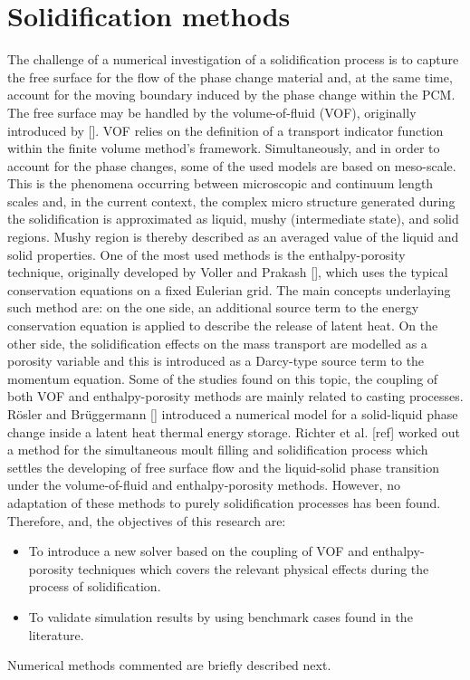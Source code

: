 \section{Solidification methods}
The challenge of a numerical investigation of a solidification process is to capture the free surface for the flow of the phase change material and, at the same time, account for the moving boundary induced by the phase change within the PCM. The free surface may be handled by the volume-of-fluid (VOF), originally introduced by [\cite{hirt_nichols_1981}]. VOF relies on the definition of a transport indicator function within the finite volume method's framework.
Simultaneously, and in order to account for the phase changes, some of the used models are based on meso-scale. This is the phenomena occurring between microscopic and continuum length scales and, in the current context, the complex micro structure generated during the solidification is approximated as liquid, mushy (intermediate state), and solid regions. Mushy region is thereby described as an averaged value of the liquid and solid properties.
\newline
\indent One of the most used methods is the enthalpy-porosity technique, originally developed by Voller and Prakash [\cite{voller_prakash_1987}], which uses the typical conservation equations on a fixed Eulerian grid. The main concepts underlaying such method are: on the one side, an additional source term to the energy conservation equation is applied to describe the release of latent heat. On the other side, the solidification effects on the mass transport are modelled as a porosity variable and this is introduced as a Darcy-type source term to the momentum equation.
\newline
\indent Some of the studies found on this topic, the coupling of both VOF and enthalpy-porosity methods are mainly related to casting processes. Rösler and Brüggermann [\cite{rösler_brüggemann_2011}] introduced a numerical model for a solid-liquid phase change inside a latent heat thermal energy storage. Richter et al. [ref] worked out a method for the simultaneous moult filling and solidification process which settles the developing of free surface flow and the liquid-solid phase transition under the volume-of-fluid and enthalpy-porosity methods.
However, no adaptation of these methods to purely solidification processes has been found. Therefore, and, the objectives of this research are:
\begin{itemize}
	\item To introduce a new solver based on the coupling of VOF and enthalpy-porosity techniques which covers the relevant physical effects during the process of solidification.
	\item	To validate simulation results by using benchmark cases found in the literature.
\end{itemize}
Numerical methods commented are briefly described next.

